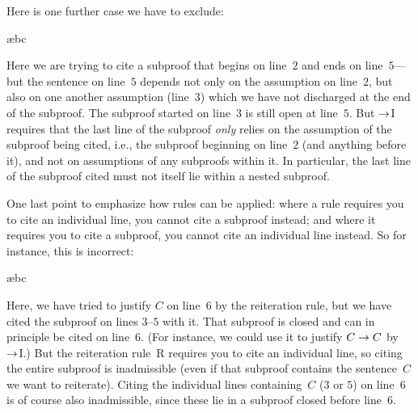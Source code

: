 Here is one further case we have to exclude:
\begin{fitchproof}
\PR
\open
	\AS
	\open
	\AS
	\ae{bc}
	\close
\close
\ifHTMLtarget
{}
\else
{}
 
\fi
\end{fitchproof}
Here we are trying to cite a subproof that begins on line~$2$ and ends on line~$5$---but the sentence on line~$5$ depends not only on the assumption on line~$2$, but also on one another assumption (line~$3$) which we have not discharged at the end of the subproof. The subproof started on line~$3$ is still open at line~$5$. But $\rightarrow$I requires that the last line of the subproof \emph{only} relies on the assumption of the subproof being cited, i.e., the subproof beginning on line~$2$ (and anything before it), and not on assumptions of any subproofs within it. In particular, the last line of the subproof cited must not itself lie within a nested subproof.


One last point to emphasize how rules can be applied: where a rule requires you to cite an individual line, you cannot cite a subproof instead; and where it requires you to cite a subproof, you cannot cite an individual line instead. So for instance, this is incorrect:
\begin{fitchproof}
\PR
\open
	\AS
	\open
	\AS
	\ae{bc}
	\close
\ifHTMLtarget
\else
{}
 
\fi
\close
{}
\end{fitchproof}
Here, we have tried to justify $C$ on line~$6$ by the reiteration
rule, but we have cited the subproof on lines $3$--$5$ with it. That
subproof is closed and can in principle be cited on line~$6$. (For
instance, we could use it to justify $C \rightarrow C$ by $\rightarrow$I.) But the
reiteration rule~R requires you to cite an individual line, so citing
the entire subproof is inadmissible (even if that subproof contains
the sentence~$C$ we want to reiterate). Citing the individual lines
containing~$C$ ($3$ or $5$) on line~$6$ is of course also inadmissible,
since these lie in a subproof closed before line~$6$.


